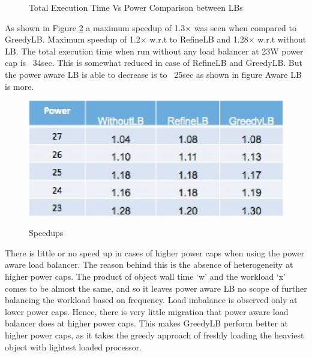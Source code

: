 \begin{figure}
\centering
\caption{Total Execution Time Vs Power Comparison between LBs} 
\label{fig:final_exec_time_vs_power}
\end{figure}
%
As shown in Figure \ref{tb:1} a maximum speedup of 1.3$\times$ was seen when compared
to GreedyLB. Maximum speedup of 1.2$\times$ w.r.t to RefineLB and 1.28$\times$ w.r.t without LB.
The total execution time when run without any load balancer at 23W power cap is
~34sec.  This is somewhat reduced in case of RefineLB and GreedyLB. But the
power aware LB is able to decrease is to ~25sec as shown in figure
Aware LB is more.

\begin{figure}[htbp]
  \begin{center}
  \scalebox{.75} {
     \includegraphics[scale=0.8]{Jacobi/EPS/t2.eps} 
  }
     \end{center}
  \caption{Speedups}
  \label{tb:1}
\end{figure}

There is little or no speed up in cases of higher power caps when using the
power aware load balancer. The reason behind this is the absence of
heterogeneity at higher power caps. The product of object wall time ‘w’ and the
workload ‘x’ comes to be almost the same, and so it leaves power aware LB no
scope of further balancing the workload based on frequency. Load imbalance is
observed only at lower power caps. Hence, there is very little migration that
power aware load balancer does at higher power caps. This makes GreedyLB
perform better at higher power caps, as it takes the greedy approach of freshly
loading the heaviest object with lightest loaded processor. 

